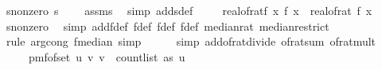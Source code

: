 \begin{isabellebody}
\ s{}{\isacharunderscore}{\kern0pt}nonzero{\isacharcolon}{\kern0pt}\ {\isachardoublequoteopen}s\ {\isachargreater}{\kern0pt}\ {}{\isachardoublequoteclose}\ \isamarkupfalse%
\ assms\ \isamarkupfalse%
\ {\isacharparenleft}{\kern0pt}simp\ add{\isacharcolon}{\kern0pt}sdef{\isacharparenright}{\kern0pt}\ \isanewline
\ \ \isamarkupfalse%
\ real{\isacharunderscore}{\kern0pt}of{\isacharunderscore}{\kern0pt}rat{\isacharunderscore}{\kern0pt}f{\isacharcolon}{\kern0pt}\ {\isachardoublequoteopen}{\isasymAnd}x{\isachardot}{\kern0pt}\ f{\isacharprime}{\kern0pt}\ x\ {\isacharequal}{\kern0pt}\ real{\isacharunderscore}{\kern0pt}of{\isacharunderscore}{\kern0pt}rat\ {\isacharparenleft}{\kern0pt}f\ x{\isacharparenright}{\kern0pt}{\isachardoublequoteclose}\isanewline
\ \ \ \ \isamarkupfalse%
\ s{}{\isacharunderscore}{\kern0pt}nonzero\ \isamarkupfalse%
\ {\isacharparenleft}{\kern0pt}simp\ add{\isacharcolon}{\kern0pt}f{\isacharunderscore}{\kern0pt}def\ f{\isacharprime}{\kern0pt}{\isacharunderscore}{\kern0pt}def\ f{}{\isacharunderscore}{\kern0pt}def\ f{}{\isacharunderscore}{\kern0pt}def\ median{\isacharunderscore}{\kern0pt}rat\ median{\isacharunderscore}{\kern0pt}restrict{\isacharparenright}{\kern0pt}\isanewline
\ \ \ \ \isamarkupfalse%
\ {\isacharparenleft}{\kern0pt}rule\ arg{\isacharunderscore}{\kern0pt}cong{}{\isacharbrackleft}{\kern0pt}\ f{\isacharequal}{\kern0pt}{\isachardoublequoteopen}median{\isachardoublequoteclose}{\isacharbrackright}{\kern0pt}{\isacharcomma}{\kern0pt}\ simp{\isacharparenright}{\kern0pt}\isanewline
\ \ \ \ \isamarkupfalse%
\ {\isacharparenleft}{\kern0pt}simp\ add{\isacharcolon}{\kern0pt}of{\isacharunderscore}{\kern0pt}rat{\isacharunderscore}{\kern0pt}divide\ of{\isacharunderscore}{\kern0pt}rat{\isacharunderscore}{\kern0pt}sum\ of{\isacharunderscore}{\kern0pt}rat{\isacharunderscore}{\kern0pt}mult{\isacharparenright}{\kern0pt}\isanewline
\isanewline
\ \ \isamarkupfalse%
\ {\isasymOmega}\ \ {\isachardoublequoteopen}{\isasymOmega}\ {\isacharequal}{\kern0pt}\ pmf{\isacharunderscore}{\kern0pt}of{\isacharunderscore}{\kern0pt}set\ {\isacharbraceleft}{\kern0pt}{\isacharparenleft}{\kern0pt}u{\isacharcomma}{\kern0pt}\ v{\isacharparenright}{\kern0pt}{\isachardot}{\kern0pt}\ v\ {\isacharless}{\kern0pt}\ count{\isacharunderscore}{\kern0pt}list\ as\ u{\isacharbraceright}{\kern0pt}{\isachardoublequoteclose}\isanewline

\end{isabellebody}
